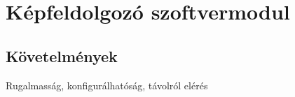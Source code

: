 \chapter{Képfeldolgozó szoftvermodul}

\section{Követelmények}

Rugalmasság, konfigurálhatóság, távolról elérés